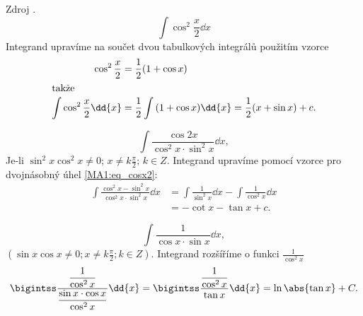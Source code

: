       \begin{example}Zdroj \cite[s.~30]{Knichal}.
        \begin{equation}\label{MA:int_ex_05}
          \int\cos^2\frac{x}{2}\dd{x}
        \end{equation}
        Integrand upravíme na součet dvou tabulkových integrálů použitím vzorce
        \begin{align*}
          \cos^2\frac{x}{2} &= \frac{1}{2}(1+\cos x)     \\ 
          \shortintertext{takže}
          \int{\cos^2\frac{x}{2}}\dd{x} 
                            &= \frac{1}{2}\int{(1+\cos x)}\dd{x} = \frac{1}{2}(x+\sin x) + c.
        \end{align*}          
      \end{example}
      
      
      
      \begin{example}
        \begin{equation}\label{MA:int_ex_07} 
          \int\frac{\cos2x}{\cos^2x\cdot\sin^2x}\dd{x}, 
        \end{equation} 
        Je-li \(\sin^2x\cos^2x\neq0;\, x\neq k\frac{\pi}{2};\, k\in Z\).
        Integrand upravíme pomocí vzorce pro dvojnásobný úhel \ref{MA1:eq_cosx2}:
        \begin{align*}
          \int\frac{\cos^2x-\sin^2x}{\cos^2x\cdot\sin^2x}\dd{x} 
             &= \int\frac{1}{\sin^2x}\dd{x} -\int\frac{1}{\cos^2x}\dd{x}        \\
             &= -\cot x - \tan x + c. 
        \end{align*}
      \end{example}
      
      \begin{example}
       \begin{equation}\label{MA:int_ex_08}
         \int\frac{1}{\cos x\cdot\sin x}\dd{x}, 
       \end{equation}
       \((\sin x\cos x\neq0; x\neq k\frac{\pi}{2}; k\in Z)\).
       Integrand rozšíříme o funkci $\displaystyle{\frac{1}{\cos^2x}}$
        \begin{equation*}
          \bigintss\dfrac{\dfrac{1}{\cos^2x}}{\dfrac{\sin x\cdot\cos x}{\cos^2x}} \dd{x} = 
          \bigintss\dfrac{\dfrac{1}{\cos^2x}}{\tan x}\dd{x} = \ln\abs{\tan x} + C.
        \end{equation*}            
      \end{example}
  
